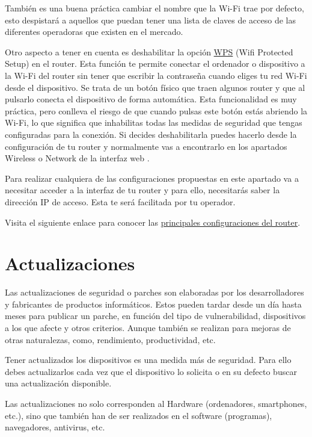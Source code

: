 \documentclass[
  a4paper,
  openany]{book}
\begin{document}
También es una buena práctica cambiar el nombre que la Wi-Fi trae por defecto, esto despistará a aquellos que puedan tener una lista de claves de acceso de las diferentes operadoras que existen en el mercado.

Otro aspecto a tener en cuenta es deshabilitar la opción \href{https://es.wikipedia.org/wiki/Wi-Fi_Protected_Setup}{WPS} (Wifi Protected Setup) en el router. Esta función te permite conectar el ordenador o dispositivo a la Wi-Fi del router sin tener que escribir la contraseña cuando eliges tu red Wi-Fi desde el dispositivo. Se trata de un botón físico que traen algunos router y que al pulsarlo conecta el dispositivo de forma automática. Esta funcionalidad es muy práctica, pero conlleva el riesgo de que cuando pulsas este botón estás abriendo la Wi-Fi, lo que significa que inhabilitas todas las medidas de seguridad que tengas configuradas para la conexión. Si decides deshabilitarla puedes hacerlo desde la configuración de tu router y normalmente vas a encontrarlo en los apartados Wireless o Network de la interfaz web \citep{XATAKA-wps}.

Para realizar cualquiera de las configuraciones propuestas en este apartado va a necesitar acceder a la interfaz de tu router y para ello, necesitarás saber la dirección IP de acceso. Esta te será facilitada por tu operador.

Visita el siguiente enlace para conocer las \href{https://www.incibe.es/ciudadania/formacion/infografias/principales-configuraciones-del-router}{principales configuraciones del router}.

\hypertarget{actualizaciones}{%
\section{Actualizaciones}\label{actualizaciones}}

Las actualizaciones de seguridad o parches son elaboradas por los desarrolladores y fabricantes de productos informáticos. Estos pueden tardar desde un día hasta meses para publicar un parche, en función del tipo de vulnerabilidad, dispositivos a los que afecte y otros criterios. Aunque también se realizan para mejoras de otras naturalezas, como, rendimiento, productividad, etc.

Tener actualizados los dispositivos es una medida más de seguridad. Para ello debes actualizarlos cada vez que el dispositivo lo solicita o en su defecto buscar una actualización disponible.

Las actualizaciones no solo corresponden al Hardware (ordenadores, smartphones, etc.), sino que también han de ser realizados en el software (programas), navegadores, antivirus, etc.
\end{document}
